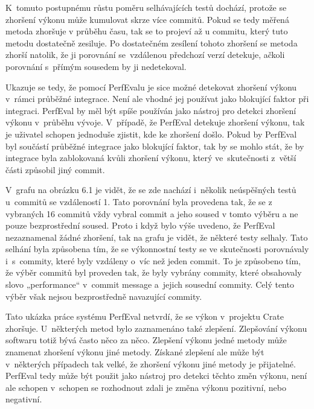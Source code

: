 K~tomuto postupnému růstu poměru selhávajících testů dochází, protože se zhoršení výkonu může kumulovat skrze více commitů.
Pokud se tedy měřená metoda zhoršuje v průběhu času, tak se to projeví až u commitu, který tuto metodu dostatečně zesiluje.
Po dostatečném zesílení tohoto zhoršení se metoda zhorší natolik, že ji porovnání se~vzdálenou předchozí verzí detekuje, ačkoli
porovnání s~přímým sousedem by ji nedetekoval.

Ukazuje se tedy, že pomocí PerfEvalu je sice možné detekovat zhoršení výkonu v~rámci průběžné integrace.
Není ale vhodné jej používat jako blokující faktor při integraci. PerfEval by měl být spíše používán jako nástroj
pro detekci zhoršení výkonu v~průběhu vývoje. V~případě, že PerfEval detekuje zhoršení výkonu, tak je uživatel
schopen jednoduše zjistit, kde ke zhoršení došlo. Pokud by PerfEval byl součástí průběžné integrace jako blokující faktor,
tak by se mohlo stát, že by integrace byla zablokovaná kvůli zhoršení výkonu, který ve~skutečnosti z~větší části způsobil jiný commit.

V~grafu na obrázku 6.1 je vidět, že se zde nachází i~několik neúspěšných testů u~commitů se vzdáleností 1.
Tato porovnání byla provedena tak, že se z vybraných 16 commitů vždy vybral commit a jeho soused v tomto
výběru a ne pouze bezprostřední soused. Proto i když bylo výše uvedeno, že PerfEval nezaznamenal žádné zhoršení,
tak na grafu je vidět, že některé testy selhaly. Tato selhání byla způsobena tím, že se výkonnostní testy
se ve skutečnosti porovnávaly i~s~commity, které byly vzdáleny o~víc než jeden commit. To je způsobeno tím,
že výběr commitů byl proveden tak, že byly vybrány commity, které obsahovaly slovo „performance“ v~commit message
a~jejich sousední commity. Celý tento výběr však nejsou bezprostředně navazující commity.

Tato ukázka práce systému PerfEval netvrdí, že se výkon v~projektu Crate zhoršuje.
U~některých metod bylo zaznamenáno také zlepšení. Zlepšování výkonu softwaru totiž bývá
často něco za něco. Zlepšení výkonu jedné metody může znamenat zhoršení výkonu jiné metody.
Získané zlepšení ale může být v~některých případech tak velké, že zhoršení výkonu jiné metody
je přijatelné. PerfEval tedy může být použit jako nástroj pro detekci těchto změn výkonu,
není ale schopen v~schopen se rozhodnout zdali je změna výkonu pozitivní, nebo negativní.